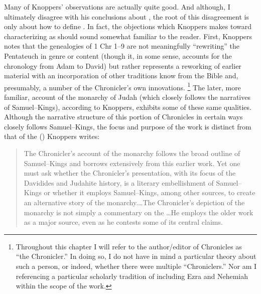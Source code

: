 Many of Knoppers' observations are actually quite good. And although, I ultimately disagree with his conclusions about \chronicles \visavis \rwb, the root of this disagreement is only about how to define \rwb. In fact, the objections which Knoppers makes toward characterizing \chronicles as \rwb should sound somewhat familiar to the reader. First, Knoppers notes that the genealogies of 1 Chr 1--9 are not meaningfully ``rewriting'' the Pentateuch in genre or content (though it, in some sense, accounts for the chronology from Adam to David) but rather represents a reworking of earlier material with an incorporation of other traditions know from the Bible and, presumably, a number of the Chronicler's own innovations.%
    \footnote{Throughout this chapter I will refer to the author/editor of Chronicles as ``the Chronicler.'' In doing so, I do not have in mind a particular theory about such a person, or indeed, whether there were multiple ``Chroniclers.'' Nor am I referencing a particular scholarly tradition of including Ezra and Nehemiah within the scope of the work.}
The later, more familiar, account of the monarchy of Judah (which closely follows the narratives of Samuel--Kings), according to Knoppers, exhibits some of these same qualities. Although the narrative structure of this portion of Chronicles in certain ways closely follows Samuel--Kings, the focus and purpose of the work is distinct from that of the \DtrH (\drth)\autocite[132]{knoppers2003} Knoppers writes:

\begin{quote}
    The Chronicler's account of the monarchy follows the broad outline of Samuel--Kings and borrows extensively from this earlier work. Yet one must ask whether the Chronicler's presentation, with its focus of the Davidides and Judahite history, is a literary embellishment of Samuel--Kings or whether it employs Samuel--Kings, among other sources, to create an alternative story of the monarchy.\dots The Chronicler's depiction of the monarchy is not simply a commentary on the \DtrH\dots He employs the older work as a major source, even as he contests some of its central claims.\autocite[132--33]{knoppers2003}
\end{quote}
\noindent
